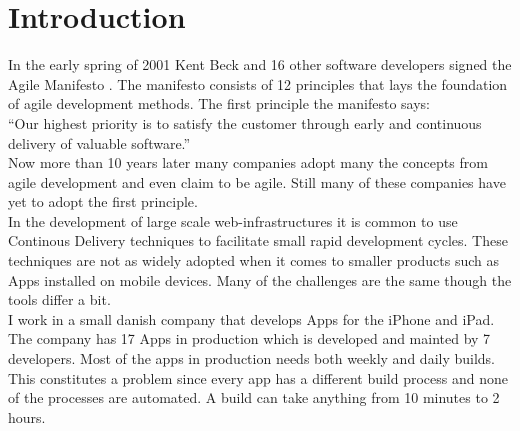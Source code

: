 \documentclass{ituthesis}
\begin{document}

\frontmatter

\thetitlepage

\clearpage
\setcounter{tocdepth}{1}

\mainmatter

\midsloppy
\sloppybottom

\chapter{Introduction}

In the early spring of 2001 Kent Beck and 16 other software developers signed the Agile Manifesto \cite{beck2001agile}. The manifesto consists of 12 principles that lays the foundation of agile development methods. The first principle the manifesto says:\\

``Our highest priority is to satisfy the customer through early and continuous delivery
of valuable software.'' \cite{beck2001agile}\\

Now more than 10 years later many companies adopt many the concepts from agile development and even claim to be agile. Still many of these companies have yet to adopt the first principle.\\

In the development of large scale web-infrastructures it is common to use Continous Delivery techniques to facilitate small rapid development cycles. These techniques are not as widely adopted when it comes to smaller products such as Apps installed on mobile devices. Many of the challenges are the same though the tools differ a bit.\\

I work in a small danish company that develops Apps for the iPhone and iPad. The company has 17 Apps in production which is developed and mainted by 7 developers. Most of the apps in production needs both weekly and daily builds. This constitutes a problem since every app has a different build process and none of the processes are automated. A build can take anything from 10 minutes to 2 hours. \cite{Humble2006}


\end{document}
